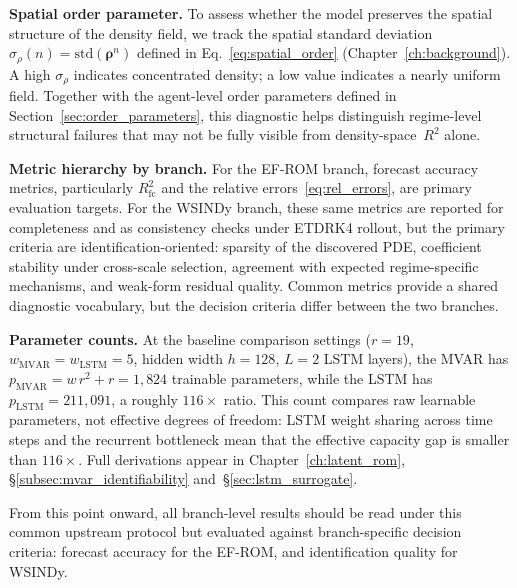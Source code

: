 \noindent\textbf{Spatial order parameter.}
\label{subsec:spatial_order_metric}
To assess whether the model preserves the spatial structure of the density
field, we track the spatial standard deviation
$\sigma_\rho(n) = \mathrm{std}(\boldsymbol{\rho}^n)$ defined in
Eq.~\eqref{eq:spatial_order} (Chapter~\ref{ch:background}).
A high $\sigma_\rho$ indicates concentrated density; a low value
indicates a nearly uniform field.  Together with the agent-level order
parameters defined in Section~\ref{sec:order_parameters}, this diagnostic
helps distinguish regime-level structural failures that may not be fully
visible from density-space~$R^2$ alone.

\noindent\textbf{Metric hierarchy by branch.}
For the EF-ROM branch, forecast accuracy metrics, particularly
$R^2_{\mathrm{fc}}$ and the relative errors~\eqref{eq:rel_errors}, are
primary evaluation targets.  For the WSINDy branch, these same metrics are
reported for completeness and as consistency checks under ETDRK4 rollout,
but the primary criteria are identification-oriented: sparsity of the
discovered PDE, coefficient stability under cross-scale selection, agreement
with expected regime-specific mechanisms, and weak-form residual quality.
Common metrics provide a shared diagnostic vocabulary, but the decision
criteria differ between the two branches.

\noindent\textbf{Parameter counts.}
\label{subsec:param_counts}
At the baseline comparison settings
($r{=}19$, $w_{\mathrm{MVAR}}{=}w_{\mathrm{LSTM}}{=}5$, hidden width
$h{=}128$, $L{=}2$ LSTM layers), the MVAR has
$p_{\mathrm{MVAR}} = w\,r^2 + r = 1{,}824$ trainable parameters, while the
LSTM has $p_{\mathrm{LSTM}} = 211{,}091$, a roughly $116\times$
ratio.  This count compares raw learnable parameters, not effective
degrees of freedom: LSTM weight sharing across time steps and the
recurrent bottleneck mean that the effective capacity gap is smaller
than $116\times$.  Full derivations appear in
Chapter~\ref{ch:latent_rom}, \S\ref{subsec:mvar_identifiability}
and~\S\ref{sec:lstm_surrogate}.

\medskip\noindent
From this point onward, all branch-level results should be read under
this common upstream protocol but evaluated against branch-specific
decision criteria: forecast accuracy for the EF-ROM, and
identification quality for WSINDy.
